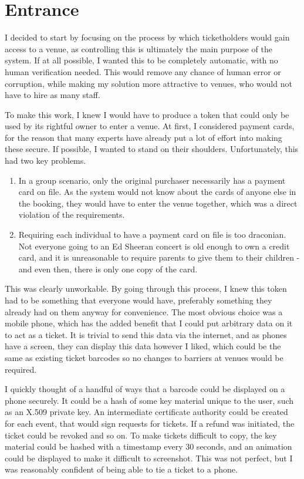 \documentclass[12pt]{bhamdissertation}
\begin{document}
\section{Entrance}

I decided to start by focusing on the process by which ticketholders would gain access to a venue, as controlling this is ultimately the main purpose of the system. If at all possible, I wanted this to be completely automatic, with no human verification needed. This would remove any chance of human error or corruption, while making my solution more attractive to venues, who would not have to hire as many staff.

To make this work, I knew I would have to produce a token that could only be used by its rightful owner to enter a venue. At first, I considered payment cards, for the reason that many experts have already put a lot of effort into making these secure. If possible, I wanted to stand on their shoulders. Unfortunately, this had two key problems.

\begin{enumerate}
    \item In a group scenario, only the original purchaser necessarily has a payment card on file. As the system would not know about the cards of anyone else in the booking, they would have to enter the venue together, which was a direct violation of the requirements.
    \item Requiring each individual to have a payment card on file is too draconian. Not everyone going to an Ed Sheeran concert is old enough to own a credit card, and it is unreasonable to require parents to give them to their children - and even then, there is only one copy of the card.
\end{enumerate}

This was clearly unworkable. By going through this process, I knew this token had to be something that everyone would have, preferably something they already had on them anyway for convenience. The most obvious choice was a mobile phone, which has the added benefit that I could put arbitrary data on it to act as a ticket. It is trivial to send this data via the internet, and as phones have a screen, they can display this data however I liked, which could be the same as existing ticket barcodes so no changes to barriers at venues would be required.

I quickly thought of a handful of ways that a barcode could be displayed on a phone securely. It could be a hash of some key material unique to the user, such as an X.509 private key. An intermediate certificate authority could be created for each event, that would sign requests for tickets. If a refund was initiated, the ticket could be revoked and so on. To make tickets difficult to copy, the key material could be hashed with a timestamp every 30 seconds, and an animation could be displayed to make it difficult to screenshot. This was not perfect, but I was reasonably confident of being able to tie a ticket to a phone.
\end{document}
